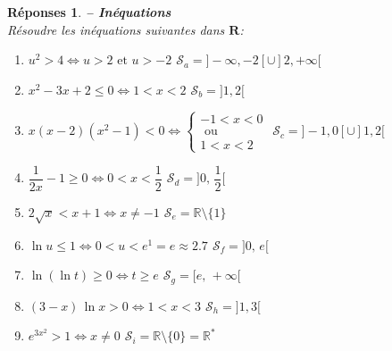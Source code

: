 \documentclass[a4paper,11pt]{article}
\newenvironment{alphate}{\begin{enumerate}[label=\alph*)]}{\end{enumerate}}
\newtheorem{rep}{R\'eponses}
\newenvironment{reponse}{\begin{rep} \em}{\end{rep}}
\begin{document}
\begin{reponse} {\bf -- In\'equations} \\ 
R\'esoudre les in\'equations suivantes dans $\mathbf{R}$:
\begin{alphate}
\item $u^2 > 4 \Leftrightarrow
    u>2 \text{ et } u>-2$ \hspace{1cm} 
    $\boxed{\mathcal{S}_a = ]-\infty,-2[\cup]2,+\infty[ }$ 
\item $x^2-3x+2 \leq 0 \Leftrightarrow
    1 < x < 2 $ \hspace{1cm} 
    $\boxed{\mathcal{S}_b = ]1, 2[ }$ 
\item $x(x-2)(x^2-1) < 0 \Leftrightarrow
    \left\{\begin{array}{l} -1 < x < 0 \\ \text{ ou }\\ 1 < x < 2 \end{array}\right. $ \hspace{1cm} 
    $\boxed{\mathcal{S}_c = ]-1,0[\cup]1,2[ }$ 
\item $\dfrac{1}{2x}-1 \geq 0 \Leftrightarrow
    0 < x < \dfrac{1}{2} $ \hspace{1cm} 
    $\boxed{\mathcal{S}_d = \big]0,  \, \dfrac{1}{2}\big[ }$ 
\item $2\sqrt{x} < x+1 \Leftrightarrow
    x \neq -1 $ \hspace{1cm} 
    $\boxed{\mathcal{S}_e = \mathbb{R}\setminus\{1\} }$ 
\item $\ln u \leq 1 \Leftrightarrow
    0 < u < e^1 = e \approx 2.7 $ \hspace{1cm} 
    $\boxed{\mathcal{S}_f = ]0 , \,  e[ }$ 
\item $\ln(\ln t) \geq 0 \Leftrightarrow
    t \geq e $ \hspace{1cm} 
    $\boxed{\mathcal{S}_g = [ e, \, +\infty[ }$ 
\item $(3-x)\,\ln x > 0 \Leftrightarrow
    1 < x <3 $ \hspace{1cm} 
    $\boxed{\mathcal{S}_h = ]1,3[ }$ 
\item $e^{3x^2} > 1 \Leftrightarrow
    x \neq 0 $ \hspace{1cm} 
    $\boxed{\mathcal{S}_i = \mathbb{R}\setminus\{0\} = \mathbb{R}^* }$ 
\end{alphate}
\end{reponse}
\bigskip 

\end{document}
